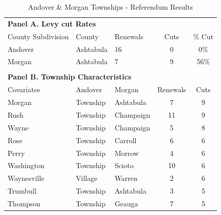 \begin{table}[ht]
    \centering
    \caption{Andover \& Morgan Townships - Referendum Results}
    \label{tab:renewals_cuts}
    \begin{threeparttable}
    \begin{tabular}{p{4cm}p{3cm}p{3cm}cc}
        \hline
        \multicolumn{5}{l}{\textbf{Panel A. Levy cut Rates}} \\
        County Subdivision  & County & Renewals & Cuts & \% Cut  \\
        \hline
        Andover & Ashtabula & 16 & 0 & 0\% \\
        Morgan & Ashtabula & 7 & 9 & 56\% \\
        \\
        \hline
        \multicolumn{5}{l}{\textbf{Panel B. Township Characteristics}} \\
        Covariates & Andover & Morgan & Renewals & Cuts \\
        \hline
        Morgan & Township & Ashtabula & 7 & 9 \\
        Rush & Township & Champaign & 11 & 9 \\
        Wayne & Township & Champaign & 5 & 8 \\
        Rose & Township & Carroll & 6 & 6 \\
        Perry & Township & Morrow & 4 & 6 \\
        Washington & Township & Scioto & 10 & 6 \\
        Waynesville & Village & Warren & 2 & 6 \\
        Trumbull & Township & Ashtabula & 3 & 5 \\
        Thompson & Township & Geauga & 7 & 5 \\

\end{tabular}
\end{threeparttable}
\end{table}
